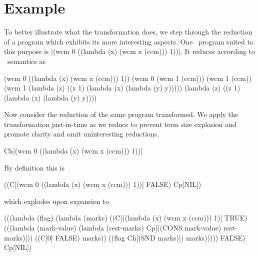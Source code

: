 \section{Example}

To better illustrate what the transformation does, we step through the reduction of a program which exhibits its more interesting aspects. One \cm\ program suited to this purpose is \scheme|(wcm 0 ((lambda (x) (wcm x (ccm))) 1))|. It reduces according to \cm\ semantics as
\begin{schemeblock}
\begin{schemedisplay}
(wcm 0 ((lambda (x) (wcm x (ccm))) 1))
(wcm 0 (wcm 1 (ccm)))
(wcm 1 (ccm))
(wcm 1 (lambda (z) ((z 1) (lambda (x) (lambda (y) y)))))
(lambda (z) ((z 1) (lambda (x) (lambda (y) y))))
\end{schemedisplay}
\end{schemeblock}

Now consider the reduction of the same program transformed. We apply the transformation just-in-time as we reduce to prevent term size explosion and promote clarity and omit uninteresting reductions.
\begin{schemeblock}
\begin{schemedisplay}
Ch[(wcm 0 ((lambda (x) (wcm x (ccm))) 1))]
\end{schemedisplay}
\end{schemeblock}

By definition this is
\begin{schemeblock}
\begin{schemedisplay}
((C[(wcm 0 ((lambda (x) (wcm x (ccm))) 1))] FALSE) Cp[NIL])
\end{schemedisplay}
\end{schemeblock}
\noindent
which explodes upon expansion to
\begin{schemeblock}
\begin{schemedisplay}
(((lambda (flag)
    (lambda (marks)
      ((C[((lambda (x) (wcm x (ccm))) 1)] TRUE)
       (((lambda (mark-value) (lambda (rest-marks) Cp[((CONS mark-value) rest-marks)]))
         ((C[0] FALSE) marks)) ((flag Ch[(SND marks)]) marks)))))
  FALSE) Cp[NIL])
\end{schemedisplay}
\end{schemeblock}

